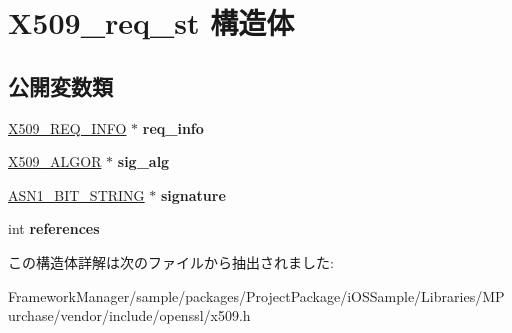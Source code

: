 \hypertarget{struct_x509__req__st}{}\section{X509\+\_\+req\+\_\+st 構造体}
\label{struct_x509__req__st}
\subsection*{公開変数類}
\begin{DoxyCompactItemize}
\item 
\hypertarget{struct_x509__req__st_acabf08f567bc1a05244378f6b9ce4ce0}{}\hyperlink{struct_x509__req__info__st}{X509\+\_\+\+R\+E\+Q\+\_\+\+I\+N\+F\+O} $\ast$ {\bfseries req\+\_\+info}\label{struct_x509__req__st_acabf08f567bc1a05244378f6b9ce4ce0}

\item 
\hypertarget{struct_x509__req__st_aece99c32f3a4dfaae643110bf2f8a8f6}{}\hyperlink{struct_x509__algor__st}{X509\+\_\+\+A\+L\+G\+O\+R} $\ast$ {\bfseries sig\+\_\+alg}\label{struct_x509__req__st_aece99c32f3a4dfaae643110bf2f8a8f6}

\item 
\hypertarget{struct_x509__req__st_a43ddd2fab56363b07b095e6f1a6d43d1}{}\hyperlink{structasn1__string__st}{A\+S\+N1\+\_\+\+B\+I\+T\+\_\+\+S\+T\+R\+I\+N\+G} $\ast$ {\bfseries signature}\label{struct_x509__req__st_a43ddd2fab56363b07b095e6f1a6d43d1}

\item 
\hypertarget{struct_x509__req__st_a4c2c07b36957fd3bb1ec804265a0184d}{}int {\bfseries references}\label{struct_x509__req__st_a4c2c07b36957fd3bb1ec804265a0184d}

\end{DoxyCompactItemize}


この構造体詳解は次のファイルから抽出されました\+:\begin{DoxyCompactItemize}
\item 
Framework\+Manager/sample/packages/\+Project\+Package/i\+O\+S\+Sample/\+Libraries/\+M\+Purchase/vendor/include/openssl/x509.\+h\end{DoxyCompactItemize}
